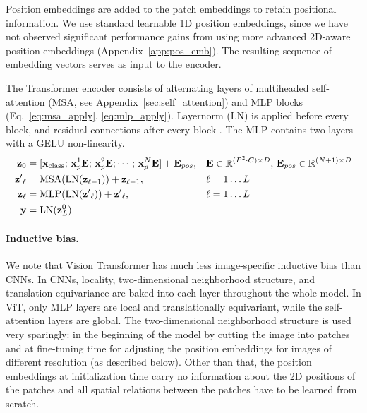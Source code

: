 Position embeddings are added to the patch embeddings to retain positional information.
We use standard learnable 1D position embeddings, since we have not observed significant performance gains from using more advanced 2D-aware position embeddings  (Appendix~\ref{app:pos_emb}).
The resulting sequence of embedding vectors serves as input to the encoder.

The Transformer encoder \citep{vaswani2017} consists of alternating layers of multiheaded self-attention (MSA, see Appendix~\ref{sec:self_attention}) and MLP blocks (Eq.~\ref{eq:msa_apply}, \ref{eq:mlp_apply}).
Layernorm (LN) is applied before every block, and residual connections after every block \citep{wang2019-preLN,Baevski2019Adaptive}.
The MLP contains two layers with a GELU non-linearity.
\begin{align}
    \mathbf{z}_0 &= [ \mathbf{x}_\text{class}; \, \mathbf{x}^1_p \mathbf{E}; \, \mathbf{x}^2_p \mathbf{E}; \cdots; \, \mathbf{x}^{N}_p \mathbf{E} ] + \mathbf{E}_{pos},
    && \mathbf{E} \in \mathbb{R}^{(P^2 \cdot C) \times D},\, \mathbf{E}_{pos}  \in \mathbb{R}^{(N + 1) \times D} \label{eq:embedding} \\
    \mathbf{z^\prime}_\ell &= \operatorname{MSA}(\operatorname{LN}(\mathbf{z}_{\ell-1})) + \mathbf{z}_{\ell-1}, && \ell=1\ldots L \label{eq:msa_apply} \\
    \mathbf{z}_\ell &= \operatorname{MLP}(\operatorname{LN}(\mathbf{z^\prime}_{\ell})) + \mathbf{z^\prime}_{\ell}, && \ell=1\ldots L  \label{eq:mlp_apply} \\
    \mathbf{y} &= \operatorname{LN}(\mathbf{z}_L^0) \label{eq:final_rep}
\end{align}

\paragraph{Inductive bias.} 
We note that Vision Transformer has much less image-specific inductive bias than CNNs. 
In CNNs, locality, two-dimensional neighborhood structure, and translation equivariance are baked into each layer throughout the whole model. 
In ViT, only MLP layers are local and translationally equivariant, while the self-attention layers are global. 
The two-dimensional neighborhood structure is used very sparingly: in the beginning of the model by cutting the image into patches and at fine-tuning time for adjusting the position embeddings for images of different resolution (as described below).
Other than that, the position embeddings at initialization time carry no information about the 2D positions of the patches and all spatial relations between the patches have to be learned from scratch.

